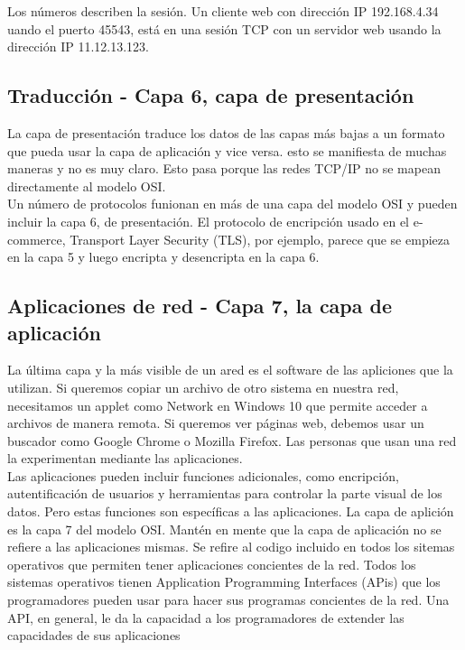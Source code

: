 \documentclass[12pt]{report}
\begin{document}
Los números describen la sesión. Un cliente web con dirección IP 
192.168.4.34 uando el puerto 45543, está en una sesión TCP con un servidor web
usando la dirección IP 11.12.13.123.

\subsection{Traducción - Capa 6, capa de presentación}
La capa de presentación traduce los datos de las capas más bajas 
a un formato que pueda usar la capa de aplicación y vice versa.
esto se manifiesta de muchas maneras y no es muy claro. Esto pasa porque
las redes TCP/IP no se mapean directamente al modelo OSI.\\
Un número de protocolos funionan en más de una capa del modelo OSI y pueden 
incluir la capa 6, de presentación. El protocolo de encripción usado en el 
e-commerce, Transport Layer Security (TLS), por ejemplo, parece que se empieza
en la capa 5 y luego encripta y desencripta en la capa 6.

\subsection{Aplicaciones de red - Capa 7, la capa de aplicación}
La última capa y la más visible de un ared es el software de las apliciones
que la utilizan. Si queremos copiar un archivo de otro sistema en nuestra red,
necesitamos un applet como Network en Windows 10 que permite 
acceder a archivos de manera remota. Si queremos ver páginas web, debemos usar
un buscador como Google Chrome o Mozilla Firefox. Las personas que usan una red
la experimentan mediante las aplicaciones.\\
Las aplicaciones pueden incluir funciones adicionales, como encripción,
autentificación de usuarios y herramientas para controlar la parte visual de los datos.
Pero estas funciones son específicas a las aplicaciones. 
La capa de aplición es la capa 7 del modelo OSI. Mantén en mente que 
la capa de aplicación no se refiere a las aplicaciones mismas. Se 
refire al codigo incluido en todos los sitemas operativos que permiten 
tener aplicaciones concientes de la red. Todos los sistemas operativos tienen
Application Programming Interfaces (APis) que los programadores pueden usar
para hacer sus programas concientes de la red. Una API, en general, le da 
la capacidad a los programadores de extender las capacidades de sus aplicaciones
\end{document}
